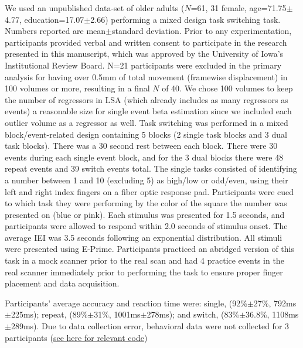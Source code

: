 \documentclass[phd,appendix,figures]{uithesis}
\begin{document}
We used an unpublished data-set
of older adults ($N$=61, 31 female,\newline
age=71.75$\pm$4.77, education=17.07$\pm$2.66)
performing a mixed design task switching task.
Numbers reported are mean$\pm$standard deviation.
Prior to any experimentation, participants provided verbal and written consent
to participate in the research presented in this manuscript, which was approved
by the University of Iowa's Institutional Review Board.
N=21 participants were excluded in the primary analysis for having over
0.5mm of total movement (framewise displacement) in 100 volumes or more,
resulting in a final $N$ of 40.
We chose 100 volumes to keep the number of regressors in LSA
(which already includes as many regressors as events) a reasonable size
for single event beta estimation since we included each outlier volume
as a regressor as well.
Task switching was performed in a mixed block/event-related design containing
5 blocks (2 single task blocks and 3 dual task blocks).
There was a 30 second rest between each block.
There were 30 events during each single event block,
and for the 3 dual blocks there were 48 repeat events and 39 switch events total.
The single tasks consisted of identifying a number between
1 and 10 (excluding 5) as high/low or odd/even, using their left and right index fingers
on a fiber optic response pad.
Participants were cued to which task they were performing by the color of the square
the number was presented on (blue or pink).
Each stimulus was presented for 1.5 seconds, and participants were allowed
to respond within 2.0 seconds of stimulus onset.
The average IEI was 3.5 seconds following an exponential distribution.
All stimuli were presented using E-Prime.
Participants practiced an abridged version of this task in a mock scanner
prior to the real scan and had 4 practice events in the real scanner immediately
prior to performing the task to ensure proper finger placement and data acquisition.

Participants' average accuracy and reaction time were:
single, (92\%$\pm$27\%, 792ms$\pm$225ms); repeat, (89\%$\pm$31\%, 1001ms$\pm$278ms);
and switch, (83\%$\pm$36.8\%,\newline
1108ms$\pm$289ms).
Due to data collection error, behavioral data were not collected for 3 participants
(\href{https://github.com/jdkent/BetaSeriesRealDataAnalysis/blob/b18b44321edf7b662a1e5ea635f64452c8d3644c/summarizeBehavior/summarize_behavior.ipynb}{see here for relevant code})
\end{document}
